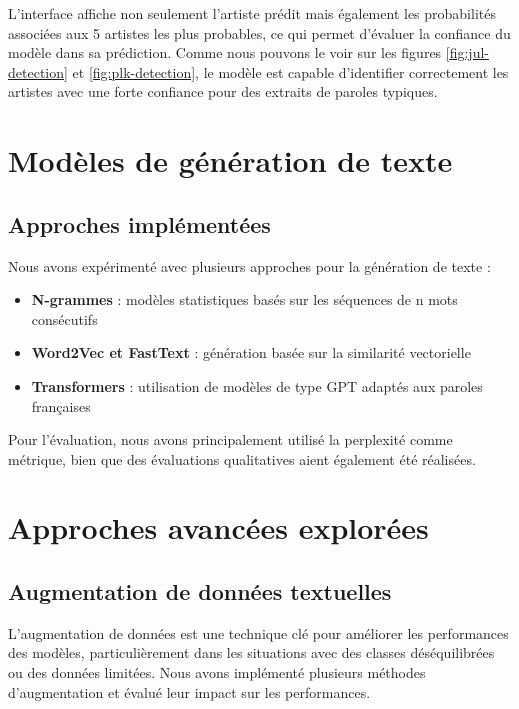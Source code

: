 \documentclass[a4paper,11pt]{article}
\begin{document}
L'interface affiche non seulement l'artiste prédit mais également les probabilités associées aux 5 artistes les plus probables, ce qui permet d'évaluer la confiance du modèle dans sa prédiction. Comme nous pouvons le voir sur les figures \ref{fig:jul-detection} et \ref{fig:plk-detection}, le modèle est capable d'identifier correctement les artistes avec une forte confiance pour des extraits de paroles typiques.

\section{Modèles de génération de texte}
\label{sec:generation}

\subsection{Approches implémentées}
Nous avons expérimenté avec plusieurs approches pour la génération de texte :

\begin{itemize}
    \item \textbf{N-grammes} : modèles statistiques basés sur les séquences de n mots consécutifs
    \item \textbf{Word2Vec et FastText} : génération basée sur la similarité vectorielle
    \item \textbf{Transformers} : utilisation de modèles de type GPT adaptés aux paroles françaises
\end{itemize}

Pour l'évaluation, nous avons principalement utilisé la perplexité comme métrique, bien que des évaluations qualitatives aient également été réalisées.

\section{Approches avancées explorées}
\label{sec:advanced}

\subsection{Augmentation de données textuelles}
\label{subsec:augmentation}

L'augmentation de données est une technique clé pour améliorer les performances des modèles, particulièrement dans les situations avec des classes déséquilibrées ou des données limitées. Nous avons implémenté plusieurs méthodes d'augmentation et évalué leur impact sur les performances.
\end{document}
